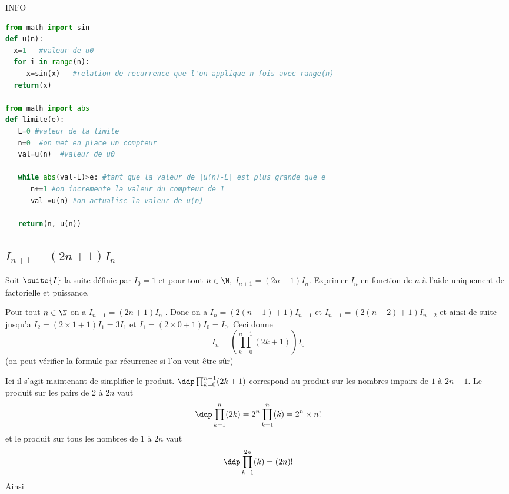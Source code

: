 \begin{correction}
\begin{enumerate}
\end{enumerate}

INFO


\begin{lstlisting}[language =Python]
from math import sin
def u(n):
  x=1	#valeur de u0
  for i in range(n):
     x=sin(x) 	#relation de recurrence que l'on applique n fois avec range(n)
  return(x)

from math import abs
def limite(e):
   L=0 #valeur de la limite
   n=0  #on met en place un compteur
   val=u(n)  #valeur de u0 
 
   while abs(val-L)>e: #tant que la valeur de |u(n)-L| est plus grande que e
      n+=1 #on incremente la valeur du compteur de 1 
      val =u(n) #on actualise la valeur de u(n)
      
   return(n, u(n))
\end{lstlisting}



\end{correction}







\subsection{$I_{n+1} =(2n+1)I_n$}

\begin{exercice}
Soit $\suite{I}$ la suite définie par $I_0=1$ et pour tout $n\in \N,$ $I_{n+1} =(2n+1)I_n$.
Exprimer $I_n$ en fonction de $n$ à l'aide uniquement de factorielle et puissance. 
\end{exercice}



\begin{correction}
Pour tout $n\in \N$ on a $I_{n+1} = (2n+1)I_n$ . Donc on a 
$I_n =(2(n-1) +1) I_{n-1}$ et $I_{n-1} =(2(n-2) +1) I_{n-2}$ et ainsi de suite jusqu'a $I_2 =(2\times 1+1) I_1=3I_1$ et $I_1 =(2\times 0+1) I_0 =I_0$. 
Ceci donne 
$$I_{n} = \left(\prod_{k=0}^{n-1} (2k+1) \right)I_0$$
(on peut vérifier la formule par récurrence si l'on veut être sûr) 

Ici il s'agit maintenant de simplifier le produit. 
$\ddp \prod_{k=0}^{n-1} (2k+1) $ correspond au produit sur les nombres impairs de $1$ à $2n-1$. Le produit sur les pairs de 2 à $2n$  vaut 
$$\ddp  \prod_{k=1}^{n} (2k)  = 2^n   \prod_{k=1}^{n} (k)  = 2^n \times n! $$
et le produit sur tous les nombres de $1$ à $2n$ vaut 
$$\ddp  \prod_{k=1}^{2n} (k)  =   (2n)! $$
Ainsi 
\end{correction}






